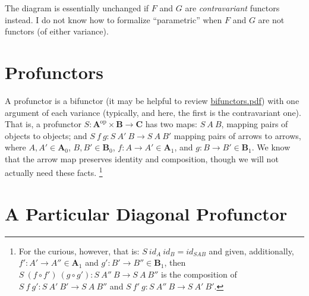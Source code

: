 \documentclass[letterpaper]{article}
\begin{document}
\begin{center}\end{center}

The diagram is essentially unchanged if $F$ and $G$ are {\em contravariant}
functors instead.  I do not know how to formalize ``parametric'' when $F$
and $G$ are not functors (of either variance).

\section{Profunctors}

A profunctor is a bifunctor (it may be helpful to review
\url{bifunctors.pdf}) with one argument of each variance (typically, and
here, the first is the contravariant one).  That is, a profunctor $S :
\mathbf{A}^{\text{op}} \times \mathbf{B} \to \mathbf{C}$ has two maps:
$S~A~B$, mapping pairs of objects to objects; and $S~f~g : S~A'~B \to
S~A~B'$ mapping pairs of arrows to arrows, where $A,A' \in \mathbf{A}_0$,
$B,B' \in \mathbf{B}_0$, $f : A \to A' \in \mathbf{A}_1$, and $g : B \to B'
\in \mathbf{B}_1$.  We know that the arrow map preserves identity and
composition, though we will not actually need these facts.%
%
\footnote{For the curious, however, that is: $S~id_A~id_B = id_{S A B}$ and
given, additionally, $f' : A' \to A'' \in \mathbf{A}_1$ and $g' : B' \to B''
\in \mathbf{B}_1$, then $S~(f \circ f')~(g \circ g') : S~A''~B \to S~A~B''$
is the composition of $S~f~g' : S~A'~B' \to S~A~B''$ and $S~f'~g : S~A''~B
\to S~A'~B'$.}

\section{A Particular Diagonal Profunctor}
\label{sec:apdp}
\end{document}
